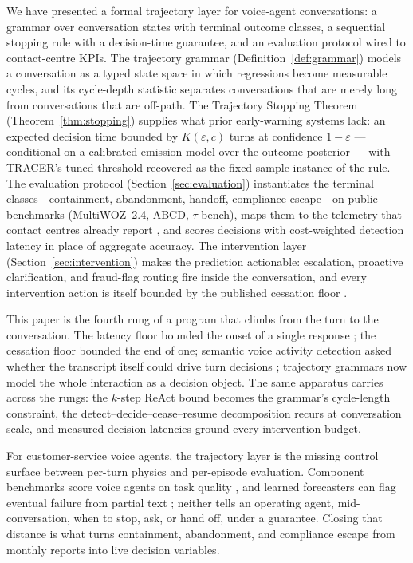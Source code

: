 We have presented a formal trajectory layer for voice-agent conversations: a grammar over conversation states with terminal outcome classes, a sequential stopping rule with a decision-time guarantee, and an evaluation protocol wired to contact-centre KPIs.
The trajectory grammar (Definition~\ref{def:grammar}) models a conversation as a typed state space in which regressions become measurable cycles, and its cycle-depth statistic separates conversations that are merely long from conversations that are off-path.
The Trajectory Stopping Theorem (Theorem~\ref{thm:stopping}) supplies what prior early-warning systems lack: an expected decision time bounded by $K(\varepsilon, c)$ turns at confidence $1-\varepsilon$ --- conditional on a calibrated emission model over the outcome posterior --- with TRACER's tuned threshold \citep{nourbakhsh2026tracer} recovered as the fixed-sample instance of the rule.
The evaluation protocol (Section~\ref{sec:evaluation}) instantiates the terminal classes---containment, abandonment, handoff, compliance escape---on public benchmarks (MultiWOZ~2.4, ABCD, $\tau$-bench), maps them to the telemetry that contact centres already report \citep{nubank2026,silentabandonment2024}, and scores decisions with cost-weighted detection latency in place of aggregate accuracy.
The intervention layer (Section~\ref{sec:intervention}) makes the prediction actionable: escalation, proactive clarification, and fraud-flag routing fire inside the conversation, and every intervention action is itself bounded by the published cessation floor \citep{garcia2026cessationfloor}.

This paper is the fourth rung of a program that climbs from the turn to the conversation.
The latency floor bounded the onset of a single response \citep{garcia2026latencyfloor}; the cessation floor bounded the end of one; semantic voice activity detection asked whether the transcript itself could drive turn decisions \citep{garcia2026asking}; trajectory grammars now model the whole interaction as a decision object.
The same apparatus carries across the rungs: the $k$-step ReAct bound becomes the grammar's cycle-length constraint, the detect--decide--cease--resume decomposition recurs at conversation scale, and measured decision latencies ground every intervention budget.

For customer-service voice agents, the trajectory layer is the missing control surface between per-turn physics and per-episode evaluation.
Component benchmarks score voice agents on task quality \citep{sierra2024taubench,tauvoice2026}, and learned forecasters can flag eventual failure from partial text \citep{nourbakhsh2026tracer,earlyeval2026}; neither tells an operating agent, mid-conversation, when to stop, ask, or hand off, under a guarantee.
Closing that distance is what turns containment, abandonment, and compliance escape from monthly reports into live decision variables.

